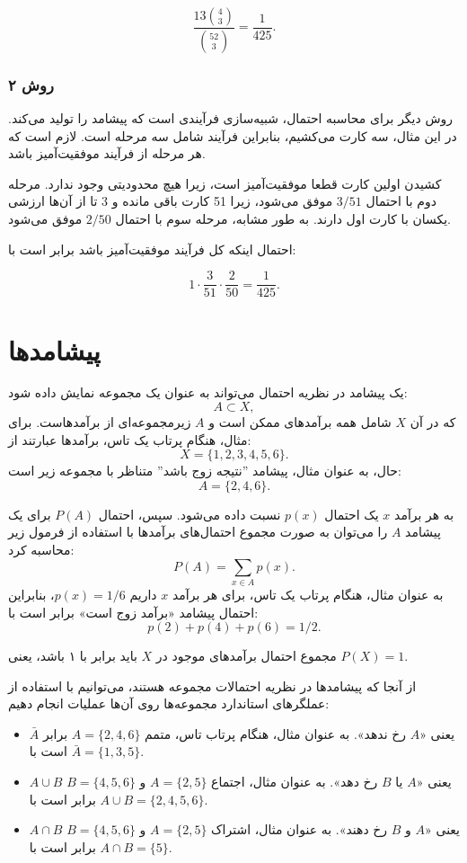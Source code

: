 \[\frac{13 {4 \choose 3}}{{52 \choose 3}} = \frac{1}{425}.\]

\subsubsection*{روش ۲}

روش دیگر برای محاسبه احتمال،
شبیه‌سازی فرآیندی است که پیشامد را تولید می‌کند.
در این مثال، سه کارت می‌کشیم، بنابراین فرآیند
شامل سه مرحله است.
لازم است که هر مرحله از فرآیند موفقیت‌آمیز باشد.

کشیدن اولین کارت قطعا موفقیت‌آمیز است،
زیرا هیچ محدودیتی وجود ندارد.
مرحله دوم با احتمال $3/51$ موفق می‌شود،
زیرا 51 کارت باقی مانده و 3 تا از آن‌ها
ارزشی یکسان با کارت اول دارند.
به طور مشابه، مرحله سوم با احتمال $2/50$ موفق می‌شود.

احتمال اینکه کل فرآیند موفقیت‌آمیز باشد برابر است با:

\[1 \cdot \frac{3}{51} \cdot \frac{2}{50} = \frac{1}{425}.\]

\section{پیشامدها}

یک پیشامد در نظریه احتمال می‌تواند به عنوان یک مجموعه نمایش داده شود:
\[A \subset X,\]
که در آن $X$ شامل همه برآمدهای ممکن است
و $A$ زیرمجموعه‌ای از برآمدهاست.
برای مثال، هنگام پرتاب یک تاس، برآمدها عبارتند از:
\[X = \{1,2,3,4,5,6\}.\]
حال، به عنوان مثال، پیشامد ''نتیجه زوج باشد''
متناظر با مجموعه زیر است:
\[A = \{2,4,6\}.\]

به هر برآمد $x$ یک احتمال $p(x)$ نسبت داده می‌شود.
سپس، احتمال $P(A)$ برای یک پیشامد
$A$ را می‌توان به صورت مجموع
احتمال‌های برآمدها با استفاده از فرمول زیر محاسبه کرد:
\[P(A) = \sum_{x \in A} p(x).\]
به عنوان مثال، هنگام پرتاب یک تاس،
برای هر برآمد $x$ داریم $p(x)=1/6$،
بنابراین احتمال پیشامد
«برآمد زوج است» برابر است با:
\[p(2)+p(4)+p(6)=1/2.\]

مجموع احتمال برآمدهای موجود در $X$ باید
برابر با ۱ باشد، یعنی $P(X)=1$.

از آنجا که پیشامدها در نظریه احتمالات مجموعه‌ هستند،
می‌توانیم با استفاده از عملگرهای استاندارد مجموعه‌ها روی آن‌ها عملیات انجام دهیم:

\begin{itemize}
\item {} $\bar A$ یعنی
«$A$ رخ ندهد».
به عنوان مثال، هنگام پرتاب تاس،
متمم $A=\{2,4,6\}$ برابر است با
$\bar A = \{1,3,5\}$.
\item {} $A \cup B$ یعنی
«$A$ یا $B$ رخ دهد».
به عنوان مثال، اجتماع
$A=\{2,5\}$
و $B=\{4,5,6\}$ برابر است با
$A \cup B = \{2,4,5,6\}$.
\item {} $A \cap B$ یعنی
«$A$ و $B$ رخ دهند».
به عنوان مثال، اشتراک
$A=\{2,5\}$ و $B=\{4,5,6\}$ برابر است با
$A \cap B = \{5\}$.
\end{itemize}

